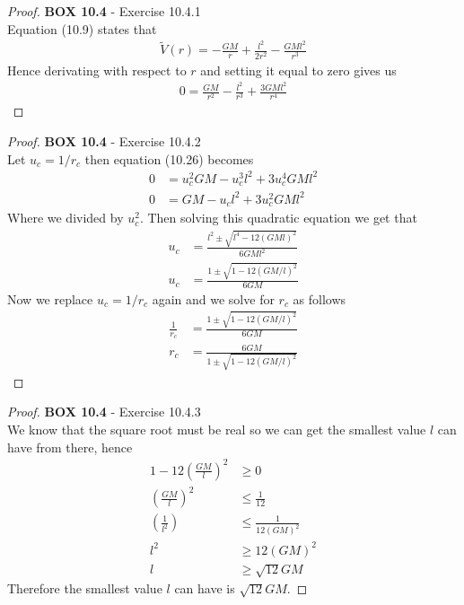 \documentclass[11pt]{article}
\theoremstyle{definition}
\begin{document}
\cleardoublepage
\begin{proof}{\textbf{BOX 10.4} - Exercise 10.4.1}\\
    Equation (10.9) states that
   \begin{align*}
        \tilde{V}(r) = -\frac{GM}{r} + \frac{l^2}{2r^2} - \frac{GMl^2}{r^3} 
   \end{align*}
   Hence derivating with respect to $r$ and setting it equal to zero gives us
   \begin{align*}
    0 = \frac{GM}{r^2} - \frac{l^2}{r^3} + \frac{3GMl^2}{r^4} 
    \end{align*}
\end{proof}
\begin{proof}{\textbf{BOX 10.4} - Exercise 10.4.2}\\
    Let $u_c = 1/r_c$ then equation (10.26) becomes
    \begin{align*}
        0 &= u_c^2GM - u_c^3l^2 + 3u_c^4GMl^2\\
        0 &= GM - u_cl^2 + 3u_c^2GMl^2
    \end{align*}
    Where we divided by $u_c^2$. Then solving this quadratic equation we get
    that
    \begin{align*}
        u_c &= \frac{l^2 \pm \sqrt{l^4 - 12(GMl)^2}}{6GMl^2}\\
        u_c &= \frac{1 \pm \sqrt{1 - 12(GM/l)^2}}{6GM}
    \end{align*}
    Now we replace $u_c = 1/r_c$ again and we solve for $r_c$ as follows
    \begin{align*}
        \frac{1}{r_c} &= \frac{1 \pm \sqrt{1 - 12(GM/l)^2}}{6GM}\\
        r_c &= \frac{6GM}{1 \pm \sqrt{1 - 12(GM/l)^2}}
    \end{align*}
\end{proof}
\begin{proof}{\textbf{BOX 10.4} - Exercise 10.4.3}\\
    We know that the square root must be real so we can get the smallest
    value $l$ can have from there, hence
    \begin{align*}
        1 - 12\left(\frac{GM}{l}\right)^2 &\geq 0\\
        \left(\frac{GM}{l}\right)^2 &\leq \frac{1}{12}\\
        \left(\frac{1}{l^2}\right) &\leq \frac{1}{12(GM)^2}\\
        l^2 &\geq 12(GM)^2\\
        l &\geq \sqrt{12}GM
    \end{align*}
    Therefore the smallest value $l$ can have is $\sqrt{12}GM$.
\end{proof}
\end{document}
